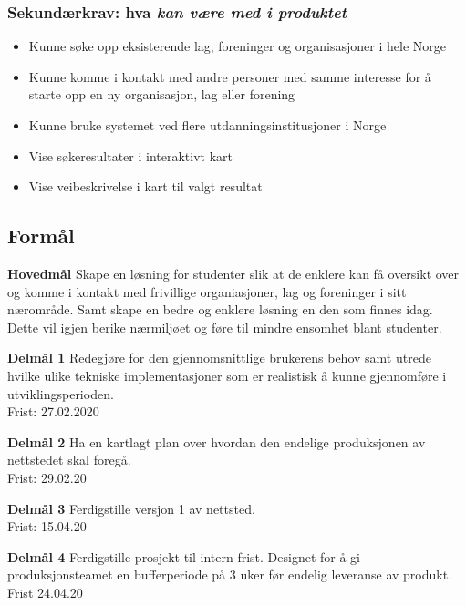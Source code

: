 \documentclass[11pt,a4paper]{report}
\begin{document}
\subsubsection{Sekundærkrav: hva \em kan \em være med i produktet}
\begin{itemize}
\item Kunne søke opp eksisterende lag, foreninger og organisasjoner i hele Norge
\item Kunne komme i kontakt med andre personer med samme interesse for å starte opp en ny organisasjon, lag eller forening
\item Kunne bruke systemet ved flere utdanningsinstitusjoner i Norge
\item Vise søkeresultater i interaktivt kart
\item Vise veibeskrivelse i kart til valgt resultat
\end{itemize}


\subsection*{Formål}

\begin{compactitem}
\item [{\bf Hovedmål}] Skape en løsning for studenter slik at de enklere kan få oversikt over og komme i kontakt med frivillige organiasjoner, lag og foreninger i sitt nærområde. Samt skape en bedre og enklere løsning en den som finnes idag. Dette vil igjen berike nærmiljøet og føre til mindre ensomhet blant studenter.
\begin{compactitem}
\item [{\bf  Delmål 1} ] Redegjøre for den gjennomsnittlige brukerens behov samt utrede hvilke ulike tekniske implementasjoner som er realistisk å kunne gjennomføre i utviklingsperioden.\\Frist: 27.02.2020
\item [{\bf  Delmål 2} ] Ha en kartlagt plan over hvordan den endelige produksjonen av nettstedet skal foregå.\\Frist: 29.02.20
\item [{\bf  Delmål 3} ] Ferdigstille versjon 1 av nettsted.\\Frist: 15.04.20
\item [{\bf  Delmål 4} ] Ferdigstille prosjekt til intern frist. Designet for å gi produksjonsteamet en bufferperiode på 3 uker før endelig leveranse av produkt. \\Frist 24.04.20
\end{compactitem} 
\end{compactitem}
\end{document}
